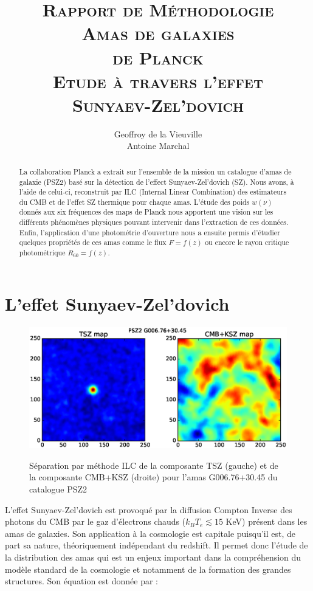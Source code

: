 \documentclass[a4paper,11pt]{article}
\title{{\textsc{\Large{Rapport de Méthodologie}\\ [3cm]
      \textbf{\LARGE{Amas de galaxies \\ de Planck}} \\ [0.6cm] 
Etude à travers l'effet \\ Sunyaev-Zel’dovich}} \\[2cm]}
\author{Geoffroy de la Vieuville \\ Antoine Marchal}
\date{}
\begin{document}
\begin{titlingpage}
\maketitle
\begin{abstract}
  La collaboration Planck a extrait sur l'ensemble de la mission un
  catalogue d'amas de galaxie (PSZ2) basé sur la détection de l'effect
  Sunyaev-Zel’dovich (SZ). Nous avons, à l'aide de celui-ci,
  reconstruit par ILC (Internal Linear Combination) des estimateurs du
  CMB et de l'effet SZ thermique pour chaque amas. 
  L'étude des poids $w(\nu)$ donnés aux six fréquences des 
  maps de Planck nous apportent une vision sur les différents
  phénomènes physiques pouvant intervenir dans l'extraction de ces données. Enfin,
  l'application d'une photométrie d'ouverture nous a ensuite permis 
  d'étudier quelques propriétés de ces amas comme le flux $F=f(z)$ 
  ou encore le rayon critique photométrique $R_{60}=f(z)$.
\end{abstract}
\end{titlingpage}

\newpage

\section{L'effet Sunyaev-Zel’dovich}

\begin{figure}[b!]
  \centering
  \includegraphics[width=4.5in]{sz_effect.eps}
  \label{sz_effect}
  \caption{Séparation par méthode ILC de la composante TSZ (gauche) et de la
    composante CMB+KSZ (droite) pour l'amas G006.76+30.45 du catalogue
  PSZ2}
\end{figure}

L'effet Sunyaev-Zel’dovich \cite{Sunyaev} est provoqué par la diffusion Compton
Inverse des photons du CMB par le gaz d'électrons chauds ($k_B T_e
\lesssim 15$ KeV) présent dans les amas de galaxies. Son application à
la cosmologie est capitale puisqu'il est, de part sa nature, 
théoriquement indépendant du redshift. Il permet donc l'étude de la
distribution des amas qui est un enjeux important dans la
compréhension du modèle standard de la cosmologie et notamment de la
formation des grandes structures. Son équation est donnée par : 
\end{document}
